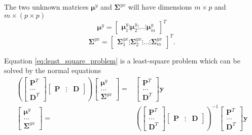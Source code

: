 The two unknown matrices $\boldsymbol{\mu}^y$ and $\mathbf{\Sigma}^{yx}$ will have dimensions $m\times p$ and $m \times (p\times p)$ 
\begin{equation}
	\label{eq:v_matrix}
	\boldsymbol{\mu}^y = 
	\begin{bmatrix}
		\boldsymbol{\mu}^y_1 \vdots \boldsymbol{\mu}^y_2 \vdots \dots \vdots \boldsymbol{\mu}^y_m
	\end{bmatrix}^T
\end{equation}
\begin{equation}
	\label{gamma_matrix}
	\mathbf{\Sigma}^{yx} = 
	\begin{bmatrix}
		\mathbf{\Sigma}_1^{yx} \vdots \mathbf{\Sigma}_2^{yx} \vdots \dots \vdots \mathbf{\Sigma}_m^{yx}
	\end{bmatrix}^T.
\end{equation}

Equation \eqref{eq:least_square_problem} is a least-square problem which can be solved by the normal equations \cite{lawson74}
\begin{equation}
	\label{eq:param_computed}
	\begin{split}
		\left( 
		\begin{bmatrix}
			\mathbf{P}^T \\
			\dots \\
			\mathbf{D}^T
		\end{bmatrix}
		\begin{bmatrix}
			\mathbf{P} & \vdots & \mathbf{D}
		\end{bmatrix}
		 \right)
		\begin{bmatrix}
			\boldsymbol{\mu}^y \\
			\dots \\
			\mathbf{\Sigma}^{yx}
		\end{bmatrix}
		= &
		\begin{bmatrix}
			\mathbf{P}^T \\
			\dots \\
			\mathbf{D}^T
		\end{bmatrix}
		\mathbf{y} \\ %
		\begin{bmatrix}
			\boldsymbol{\mu}^y \\
			\dots \\
			\mathbf{\Sigma}^{yx}
		\end{bmatrix}
		= &
		\left( 
		\begin{bmatrix}
			\mathbf{P}^T \\
			\dots \\
			\mathbf{D}^T
		\end{bmatrix}
		\begin{bmatrix}
			\mathbf{P} & \vdots & \mathbf{D}
		\end{bmatrix}
		 \right)^{-1}
		\begin{bmatrix}
			\mathbf{P}^T \\
			\dots \\
			\mathbf{D}^T
		\end{bmatrix}
		\mathbf{y} \\ %
	\end{split}
\end{equation}

